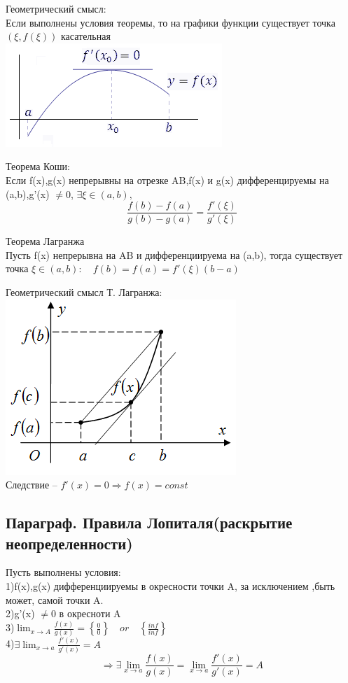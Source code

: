 \documentclass[a4paper, 12pt]{article}
\begin{document}
Геометрический смысл:\\
Если выполнены условия теоремы, то на графики функции существует точка $ (\xi,f(\xi))  $ касательная\\ 
\includegraphics{img/361.png}\\

\begin{mdframed}[backgroundcolor=blue!20] 
       Теорема Коши:\\
       Если f(x),g(x) непрерывны на отрезке AB,f(x) и g(x) дифференцируемы на (a,b),g'(x) $ \neq 0 $, $ \exists \xi \in (a,b), $
       \[
           \frac{f(b)- f(a)}{g(b) - g(a)} = \frac{f'(\xi)}{g'(\xi)}
         \]  

        Теорема Лагранжа\\
        Пусть f(x) непрерывна на AB и дифференциируема на (a,b), тогда существует точка $ \xi \in (a,b): \quad f(b) = f(a) = f'(\xi)(b-a) $\\ 
    \end{mdframed}
\newpage
Геометрический смысл Т. Лагранжа:\\
\quad \quad \quad \includegraphics{img/362.png}\\
Следствие -- $ f'(x) = 0 \Rightarrow f(x) = const $ \\

\subsection{Параграф. Правила Лопиталя(раскрытие неопределенности)}
Пусть выполнены условия:\\
1)f(x),g(x) дифференциируемы в окресности точки A, за исключением ,быть может, самой точки A.\\
2)g'(x) $ \neq 0 $ в окресноти A\\
3)$ \lim_{x\to A} \frac{f(x)}{g(x)} = \left\{\frac{0}{0}\right\} \quad  or \quad \left\{\frac{inf}{inf}\right\} $\\
4)$ \exists \lim_{x\to a} \frac{f'(x)}{g'(x)} = A $\\
\[
  \Rightarrow \exists \lim_{x\to a} \frac{f(x)}{g(x)} = \lim_{x\to a} \frac{f'(x)}{g'(x)} = A
\]
\end{document}

